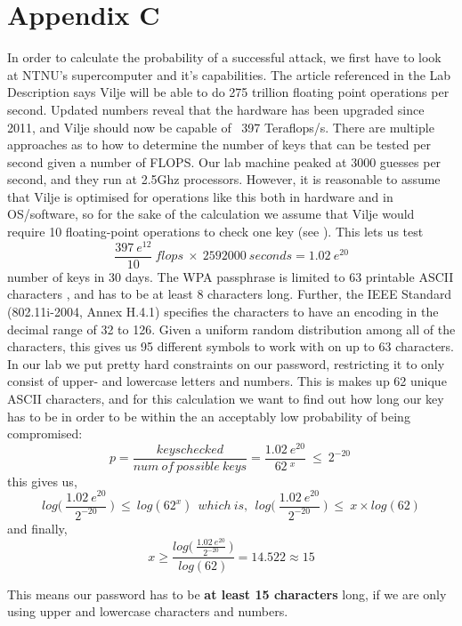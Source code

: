 \documentclass[a4paper,11pt]{article}
\begin{document}
\section*{Appendix C} \label{sec:appendixc}
In order to calculate the probability of a successful attack, we first have to look at NTNU's supercomputer and it's capabilities. The article referenced \cite{fjord} in the Lab Description says Vilje will be able to do 275 trillion floating point operations per second. Updated numbers \cite{vilje} reveal that the hardware has been upgraded since 2011, and Vilje should now be capable of ~397 Teraflops/s. There are multiple approaches as to how to determine the number of keys that can be tested per second given a number of FLOPS. Our lab machine peaked at 3000 guesses per second, and they run at 2.5Ghz processors. However, it is reasonable to assume that Vilje is optimised for operations like this both in hardware and in OS/software, so for the sake of the calculation we assume that Vilje would require 10 floating-point operations to check one key (see \cite{flops}). This lets us test \[
	\dfrac{397\: e^{12}}{10}\: flops\: \times\: 2592000\: seconds = 1.02\: e^{20}
\] number of keys in 30 days. The WPA passphrase is limited to 63 printable ASCII characters \cite{ascii}, and has to be at least 8 characters long. Further, the IEEE Standard (802.11i-2004, Annex H.4.1) specifies the characters to have an encoding in the decimal range of 32 to 126. Given a uniform random distribution among all of the characters, this gives us 95 different symbols to work with on up to 63 characters. In our lab we put pretty hard constraints on our password, restricting it to only consist of upper- and lowercase letters and numbers. This is makes up 62 unique ASCII characters, and for this calculation we want to find out how long our key has to be in order to be within the an acceptably low probability of being compromised: 
\[
	p = \frac{keyschecked}{num\: of\: possible\: keys} = \frac{1.02\: e^{20}}{62\: ^x}\: \leq\: 2^{-20}\: 
\] this gives us,
\[
	log\bigg(\: \frac{1.02\: e^{20}}{2^{-20}}\: \bigg)\: \leq\: log(62^x)\:\: which\: is,\:\: log\bigg(\: \frac{1.02\: e^{20}}{2^{-20}}\: \bigg)\: \leq\: x\times log(62)
\] and finally,
\[
	x \geq \frac{log\Big(\: \frac{1.02\: e^{20}}{2^{-20}}\: \Big)}{log(62)} = 14.522 \approx 15
\]

\noindent This means our password has to be \textbf{at least 15 characters} long, if we are only using upper and lowercase characters and numbers.

\newpage
\end{document}

